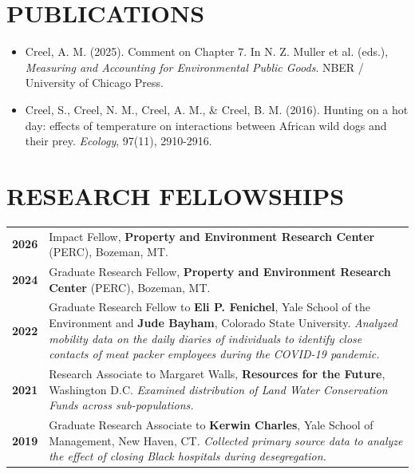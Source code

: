 \documentclass[11pt]{article}
\begin{document}
\section*{PUBLICATIONS}

\begin{itemize}[left=0pt, label={}, align=left, itemsep=0pt, parsep=0pt]
    \setlength{\itemindent}{-1em}
    \setlength{\leftskip}{1em}
    \setlength{\parindent}{-1em}
    \item Creel, A. M. (2025). Comment on Chapter 7. In N. Z. Muller et al. (eds.), \textit{Measuring and Accounting for Environmental Public Goods}. NBER / University of Chicago Press.
    \item Creel, S., Creel, N. M., Creel, A. M., \& Creel, B. M. (2016). Hunting on a hot day: effects of temperature on interactions between African wild dogs and their prey. \textit{Ecology}, 97(11), 2910-2916.
\end{itemize}


\section*{RESEARCH FELLOWSHIPS}
\begin{longtable}{>{\bfseries}r p{5.5in}} %
2026 & Impact Fellow, \textbf{Property and Environment Research Center} (PERC), Bozeman, MT. \\
2024 & Graduate Research Fellow, \textbf{Property and Environment Research Center} (PERC), Bozeman, MT. \\
2022 & Graduate Research Fellow to \textbf{Eli P. Fenichel}, Yale School of the Environment and \textbf{Jude Bayham}, Colorado State University. \textit{Analyzed mobility data on the daily diaries of individuals to identify close contacts of meat packer employees during the COVID-19 pandemic.} \\
2021 & Research Associate to Margaret Walls, \textbf{Resources for the Future}, Washington D.C. \textit{Examined distribution of Land Water Conservation Funds across sub-populations.}\\
2019 & Graduate Research Associate to \textbf{Kerwin Charles}, Yale School of Management, New Haven, CT. \textit{Collected primary source data to analyze the effect of closing Black hospitals during desegregation.} \\
\end{longtable}
\end{document}
